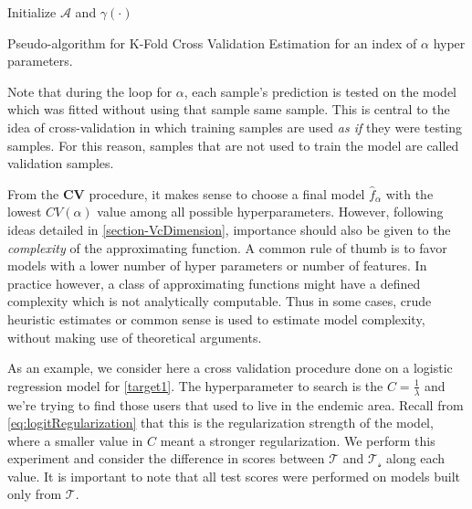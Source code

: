  \begin{algorithm}%
 \SetAlgoLined{}
 Initialize $\mathcal{A}$ and $\gamma(\cdot)$\;
 \caption{Pseudo-algorithm for K-Fold Cross Validation Estimation for an index of $\alpha$ hyper parameters.}
 \end{algorithm}

Note that during the loop for $\alpha$, each sample's prediction is tested on the model which was fitted without using that sample same sample.
This is central to the idea of cross-validation in which training samples are used \textit{as if} they were testing samples.
For this reason, samples that are not used to train the model are called validation samples.

From the \textbf{CV} procedure, it makes sense to choose a final model $\hat{f}_\alpha$ with the lowest $CV(\alpha)$ value among all possible hyperparameters.
However, following ideas detailed in \cref{section-VcDimension}, importance should also be given to the \textit{complexity} of the approximating function.
A common rule of thumb is to favor models with a lower number of hyper parameters or number of features.
In practice however, a class of approximating functions might have a defined complexity which is not analytically computable.
Thus in some cases, crude heuristic estimates or common sense is used to estimate model complexity, without making use of theoretical arguments.


As an example, we consider here a cross validation procedure done on a logistic regression model for \cref{target1}.
The hyperparameter to search is the $C = \frac{1}{\lambda}$ and we're trying to find those users that used to live in the endemic area.
 Recall from \cref{eq:logitRegularization} that this is the regularization strength of the model, where a smaller value in $C$ meant a stronger regularization.
 We perform this experiment and consider the difference in scores between  $\mathcal{T}$ and $\mathcal{T_s}$ along each value.
It is important to note that all test scores were performed on models built only from $\mathcal{T}$.


